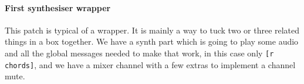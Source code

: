 \paragraph{First synthesiser wrapper}
This patch is typical of a wrapper. It is mainly a way to tuck two or three
related things in a box together. We have a synth part which is going to play some
audio and all the global messages needed to make that work, in this case only
\verb+[r chords]+, and we have a mixer channel with a few extras to implement a 
channel mute.
